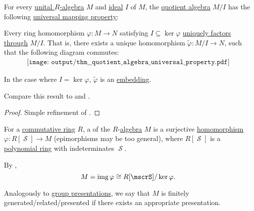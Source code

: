 \begin{theorem}\label{thm:quotient_algebra_universal_property}
  For every \hyperref[def:algebra_over_ring]{unital \( R \)-algebra} \( M \) and \hyperref[def:semiring_ideal]{ideal} \( I \) of \( M \), the \hyperref[def:algebra_over_ring/quotient]{quotient algebra} \( M / I \) has the following \hyperref[rem:universal_mapping_property]{universal mapping property}:
  \begin{displayquote}
    Every ring homomorphism \( \varphi: M \to N \) satisfying \( I \subseteq \ker \varphi \) \hyperref[def:factors_through]{uniquely factors through} \( M / I \). That is, there exists a unique homomorphism \( \widetilde{\varphi}: M / I \to N \), such that the following diagram commutes:
    \begin{equation}\label{eq:thm:quotient_algebra_universal_property/diagram}
      \begin{aligned}
        \texttt{[image: output/thm\_\_quotient\_algebra\_universal\_property.pdf]}
      \end{aligned}
    \end{equation}

    In the case where \( I = \ker \varphi \), \( \widetilde{\varphi} \) is an \hyperref[def:first_order_homomorphism_invertibility/embedding]{embedding}.
  \end{displayquote}

  Compare this result to  and .
\end{theorem}
\begin{proof}
  Simple refinement of .
\end{proof}

\begin{definition}\label{def:algebra_presentation}
  For a \hyperref[def:ring/commutative]{commutative ring} \( R \), a  of the \( R \)-\hyperref[def:algebra_over_ring]{algebra} \( M \) is a surjective \hyperref[def:module/homomorphism]{homomorphism} \( \varphi: R[\mscrS] \to M \) (epimorphisms may be too general), where \( R[\mscrS] \) is a \hyperref[def:polynomial_algebra]{polynomial ring} with indeterminates \( \mscrS \).

  By ,
  \begin{equation*}
    M = \img \varphi \cong R[\mscrS] / \ker \varphi.
  \end{equation*}

  Analogously to \hyperref[def:group_presentation]{group presentations}, we say that \( M \) is finitely generated/related/presented if there exists an appropriate presentation.
\end{definition}

